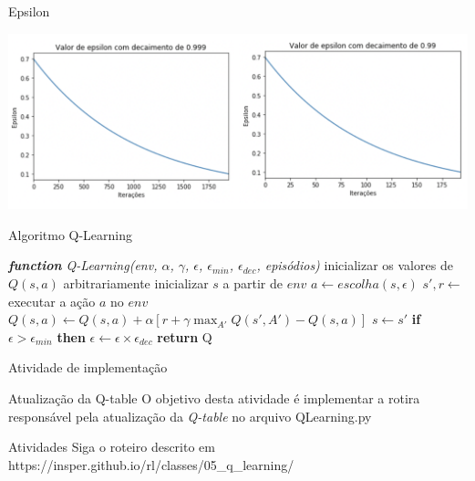 \documentclass{beamer}
\begin{document}
\begin{frame}{Epsilon}
	  \begin{center}
		\includegraphics[width=\textwidth]{figuras/epsilon.png}
	\end{center}
\end{frame}

\begin{frame}{Algoritmo Q-Learning}
	
\begin{algorithmic} 
	\STATE \emph{\textbf{function} Q-Learning(env, $\alpha$, $\gamma$, $\epsilon$, $\epsilon_{min}$, $\epsilon_{dec}$, episódios)}
	\STATE inicializar os valores de $Q(s, a)$ arbitrariamente
	\STATE inicializar $s$ a partir de $env$
	\REPEAT
	\STATE $a \leftarrow escolha(s, \epsilon)$
	\STATE $s', r \leftarrow$ executar a ação $a$ no $env$
	\STATE $Q(s,a) \leftarrow Q(s,a) + \alpha [r +\gamma \max_{A'}{Q(s', A')} - Q(s,a)]$
	\STATE$s  \leftarrow s'$
	\STATE \textbf{if} $\epsilon > \epsilon_{min}$ \textbf{then} $\epsilon \leftarrow \epsilon \times \epsilon_{dec}$
	\ENDFOR
	\STATE \textbf{return} Q
\end{algorithmic}	
\end{frame}

\begin{frame}{Atividade de implementação}
	
	\begin{alertblock}{Atualização da Q-table}
		O objetivo desta atividade é implementar a rotira responsável pela atualização da \textit{Q-table} no arquivo QLearning.py
	\end{alertblock}
	
	\begin{block}{Atividades}
		Siga o roteiro descrito em https://insper.github.io/rl/classes/05\_q\_learning/ \href{https://insper.github.io/rl/classes/05_q_learning/}
		{}
	\end{block}
	
\end{frame}
\end{document}
